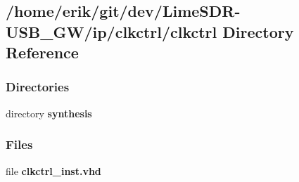 \subsection{/home/erik/git/dev/\+Lime\+S\+D\+R-\/\+U\+S\+B\+\_\+\+G\+W/ip/clkctrl/clkctrl Directory Reference}
\label{dir_cfbe08b7e20ea0752691d86e2a212f81}
\subsubsection*{Directories}
\begin{DoxyCompactItemize}
\item 
directory {\bf synthesis}
\end{DoxyCompactItemize}
\subsubsection*{Files}
\begin{DoxyCompactItemize}
\item 
file {\bf clkctrl\+\_\+inst.\+vhd}
\end{DoxyCompactItemize}
